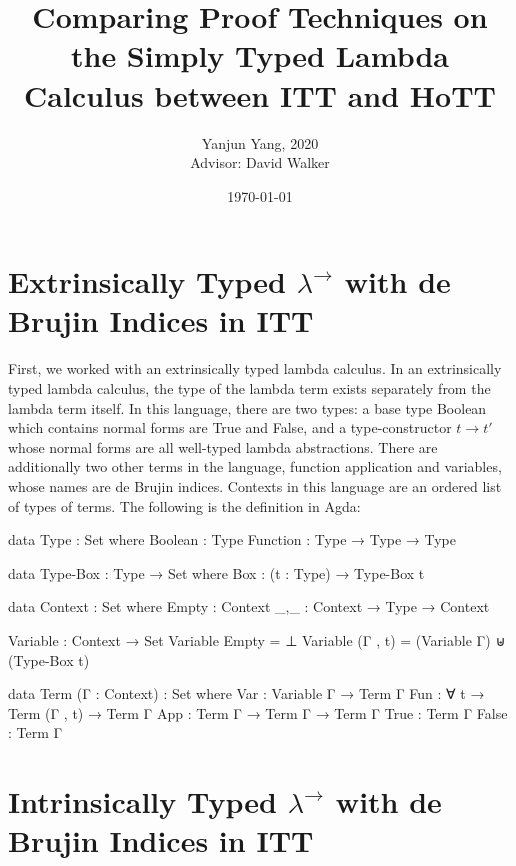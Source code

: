 \documentclass[12pt, letterpaper]{article}
\title{Comparing Proof Techniques on the Simply Typed Lambda Calculus between ITT and HoTT}
\author{Yanjun Yang, 2020\\Advisor: David Walker}
\date{\today}
\begin{document}
\doublespacing
\maketitle


\section{Extrinsically Typed $\lambda^{\to}$ with de Brujin Indices in ITT}
\begin{flushleft}
First, we worked with an extrinsically typed lambda calculus. In an extrinsically typed lambda calculus, the type of the lambda term exists separately from the lambda term itself. In this language, there are two types: a base type Boolean which contains normal forms are True and False, and a type-constructor $t\to t'$ whose normal forms are all well-typed lambda abstractions. There are additionally two other terms in the language, function application and variables, whose names are de Brujin indices. Contexts in this language are an ordered list of types of terms. The following is the definition in Agda:
\begin{code}
data Type : Set where
    Boolean : Type
    Function : Type → Type → Type

  data Type-Box : Type → Set where
    Box : (t : Type) → Type-Box t

  data Context : Set where
    Empty : Context
    _,_ : Context → Type → Context

  Variable : Context → Set
  Variable Empty = ⊥
  Variable (Γ , t) = (Variable Γ) ⊎ (Type-Box t)
  
  data Term (Γ : Context) : Set where
    Var : Variable Γ → Term Γ
    Fun : ∀ t → Term (Γ , t) → Term Γ
    App : Term Γ → Term Γ → Term Γ
    True : Term Γ
    False : Term Γ
\end{code}
\end{flushleft}

\section{Intrinsically Typed $\lambda^{\to}$ with de Brujin Indices in ITT}



\end{document}
